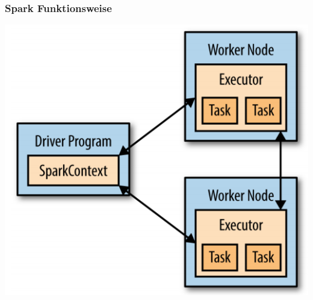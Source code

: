 \begin{frame}
    \frametitle{Spark Funktionsweise}
    \centerline{\includegraphics[width=0.7\linewidth]{spark-components-execution.png}}
\end{frame}



